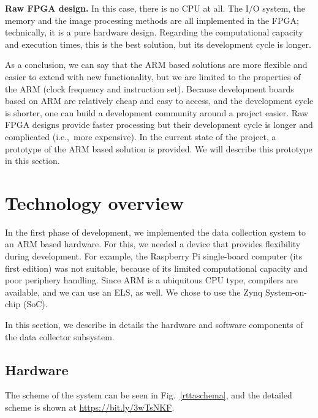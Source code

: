 \documentclass[b5paper,12pt]{report}
\theoremstyle{definition}
\begin{document}
{\bf{Raw FPGA design.}} In this case, there is no CPU at all. The I/O system, the memory and the image processing methods are all implemented in the FPGA; technically, it is a pure hardware design. Regarding the computational capacity and execution times, this is the best solution, but its development cycle is longer.

As a conclusion, we can say that the ARM based solutions are more flexible and easier to extend with new functionality, but we are limited to the properties of the ARM (clock frequency and instruction set). Because development boards based on ARM are relatively cheap and easy to access, and the development cycle is shorter, one can build a development community around a project easier. Raw FPGA designs provide faster processing but their development cycle is longer and complicated (i.e.,~more expensive). In the current state of the project, a prototype of the ARM based solution is provided. We will describe this prototype in this section.

\section{Technology overview}

In the first phase of development, we implemented the data collection system to an ARM based hardware. For this, we needed a device that provides flexibility during development. For example, the Raspberry Pi single-board computer (its first edition) was not suitable, because of its limited computational capacity and poor periphery handling. Since ARM is a ubiquitous CPU type, compilers are available, and we can use an ELS, as well. We chose to use the Zynq System-on-chip (SoC).

In this section, we describe in details the hardware and software components of the data collector subsystem.

\subsection{Hardware}
\label{rttahw}

The scheme of the system can be seen in Fig.~\ref{rttaschema}, and the detailed scheme is shown at \url{https://bit.ly/3wTsNKF}.
\end{document}
